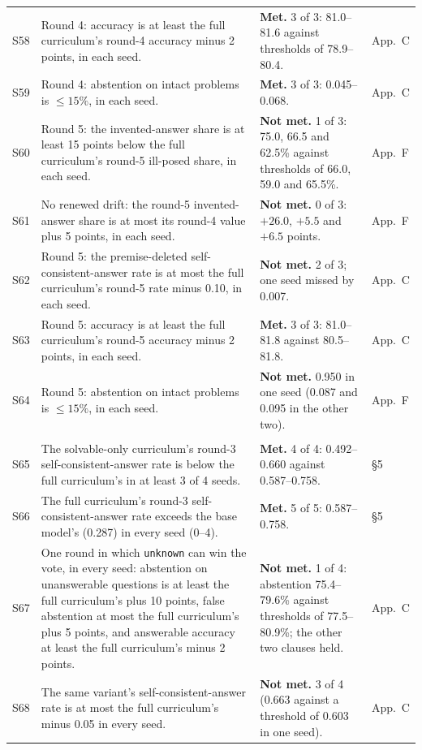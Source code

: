 \documentclass[10pt,a4paper]{article}
\makeatletter
\newcommand{\unk}{\texttt{unknown}}
\newcommand{\met}{\textbf{Met.}}
\newcommand{\nmet}{\textbf{Not met.}}
\newcommand{\sub}[1]{\multicolumn{4}{@{}l}{\emph{#1}}\\\addlinespace[1pt]}
\makeatother
\begin{document}
\begin{longtable}{@{}L{0.9cm}L{7.8cm}L{6.1cm}L{1.3cm}@{}}
S58 & Round 4: accuracy is at least the full curriculum's round-4 accuracy minus 2 points, in each seed. & \met{} 3 of 3: 81.0--81.6 against thresholds of 78.9--80.4. & App.~C \\
S59 & Round 4: abstention on intact problems is $\le 15\%$, in each seed. & \met{} 3 of 3: 0.045--0.068. & App.~C \\
S60 & Round 5: the invented-answer share is at least 15 points below the full curriculum's round-5 ill-posed share, in each seed. & \nmet{} 1 of 3: 75.0, 66.5 and 62.5\% against thresholds of 66.0, 59.0 and 65.5\%. & App.~F \\
S61 & No renewed drift: the round-5 invented-answer share is at most its round-4 value plus 5 points, in each seed. & \nmet{} 0 of 3: $+26.0$, $+5.5$ and $+6.5$ points. & App.~F \\
S62 & Round 5: the premise-deleted self-consistent-answer rate is at most the full curriculum's round-5 rate minus 0.10, in each seed. & \nmet{} 2 of 3; one seed missed by 0.007. & App.~C \\
S63 & Round 5: accuracy is at least the full curriculum's round-5 accuracy minus 2 points, in each seed. & \met{} 3 of 3: 81.0--81.8 against 80.5--81.8. & App.~C \\
S64 & Round 5: abstention on intact problems is $\le 15\%$, in each seed. & \nmet{} 0.950 in one seed (0.087 and 0.095 in the other two). & App.~F \\
\addlinespace[2pt]
\sub{UMWP}
S65 & The solvable-only curriculum's round-3 self-consistent-answer rate is below the full curriculum's in at least 3 of 4 seeds. & \met{} 4 of 4: 0.492--0.660 against 0.587--0.758. & \S5 \\
S66 & The full curriculum's round-3 self-consistent-answer rate exceeds the base model's (0.287) in every seed (0--4). & \met{} 5 of 5: 0.587--0.758. & \S5 \\
S67 & One round in which \unk{} can win the vote, in every seed: abstention on unanswerable questions is at least the full curriculum's plus 10 points, false abstention at most the full curriculum's plus 5 points, and answerable accuracy at least the full curriculum's minus 2 points. & \nmet{} 1 of 4: abstention 75.4--79.6\% against thresholds of 77.5--80.9\%; the other two clauses held. & App.~C \\
S68 & The same variant's self-consistent-answer rate is at most the full curriculum's minus 0.05 in every seed. & \nmet{} 3 of 4 (0.663 against a threshold of 0.603 in one seed). & App.~C \\

\end{longtable}
\end{document}
